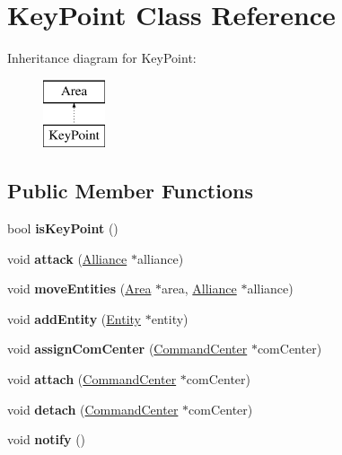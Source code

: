 \hypertarget{classKeyPoint}{}\section{Key\+Point Class Reference}
\label{classKeyPoint}
Inheritance diagram for Key\+Point\+:\begin{figure}[H]
\begin{center}
\leavevmode
\includegraphics[height=2.000000cm]{classKeyPoint}
\end{center}
\end{figure}
\subsection*{Public Member Functions}
\begin{DoxyCompactItemize}
\item 
\mbox{\label{classKeyPoint_a1beb436d8efa973f3dc290a722727961}} 
bool {\bfseries is\+Key\+Point} ()
\item 
\mbox{\label{classKeyPoint_a137026380d2907f880bb4c48b30c2d5e}} 
void {\bfseries attack} (\hyperlink{classAlliance}{Alliance} $\ast$alliance)
\item 
\mbox{\label{classKeyPoint_a3fc425554378989ba83ebd22f7305f14}} 
void {\bfseries move\+Entities} (\hyperlink{classArea}{Area} $\ast$area, \hyperlink{classAlliance}{Alliance} $\ast$alliance)
\item 
\mbox{\label{classKeyPoint_aad6d7102c8e3d11fe5f29b163f50dbc3}} 
void {\bfseries add\+Entity} (\hyperlink{classEntity}{Entity} $\ast$entity)
\item 
\mbox{\label{classKeyPoint_a7d17cd6174295baf87b213170bca3da8}} 
void {\bfseries assign\+Com\+Center} (\hyperlink{classCommandCenter}{Command\+Center} $\ast$com\+Center)
\item 
\mbox{\label{classKeyPoint_a42df3ce6652f1817fc04324ad15a868d}} 
void {\bfseries attach} (\hyperlink{classCommandCenter}{Command\+Center} $\ast$com\+Center)
\item 
\mbox{\label{classKeyPoint_aea6e2eca9de4d986c1350270d0e88401}} 
void {\bfseries detach} (\hyperlink{classCommandCenter}{Command\+Center} $\ast$com\+Center)
\item 
\mbox{\label{classKeyPoint_a5b21817babe753b2b684d70479f3eaf2}} 
void {\bfseries notify} ()
\end{DoxyCompactItemize}


